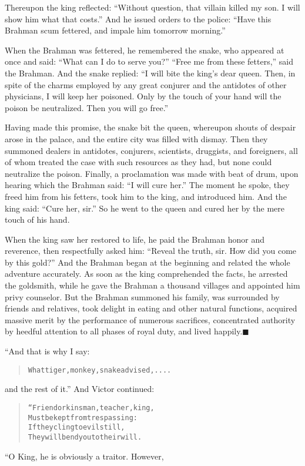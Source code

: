 \documentclass[article, twoside, 14pt]{memoir}
\newcommand{\qed}{\hfill \ensuremath{\blacksquare}}
\renewenvironment{verbatim}{%
\begin{quote}%
\vskip -10pt%
\begin{alltt}\normalfont\large}{\end{alltt}%
\end{quote}%
\vskip -10pt
} %
\begin{document}
Thereupon the king reflected:
``Without question, that villain killed my son. I will show him what that costs.''
And he issued orders to the police:
``Have this Brahman scum fettered, and impale him tomorrow morning.''

When the Brahman was fettered, he remembered the snake, who
appeared at once and said: ``What can I do to serve you?''
``Free me from these fetters,'' said the Brahman. And the snake
replied:
``I will bite the king's dear queen. Then, in spite of the charms employed by any great conjurer and the antidotes of other physicians, I will keep her poisoned. Only by the touch of your hand will the poison be neutralized. Then you will go free.''

Having made this promise, the snake bit the queen, whereupon shouts
of despair arose in the palace, and the entire city was filled with
dismay. Then they summoned dealers in antidotes, conjurers,
scientists, druggists, and foreigners, all of whom treated the case
with such resources as they had, but none could neutralize the
poison. Finally, a proclamation was made with beat of drum, upon
hearing which the Brahman said: ``I will cure her.'' The moment he
spoke, they freed him from his fetters, took him to the king, and
introduced him. And the king said: ``Cure her, sir.'' So he went to
the queen and cured her by the mere touch of his hand.

When the king saw her restored to life, he paid the Brahman honor
and reverence, then respectfully asked him:
``Reveal the truth, sir. How did you come by this gold?'' And the
Brahman began at the beginning and related the whole adventure
accurately. As soon as the king comprehended the facts, he arrested
the goldsmith, while he gave the Brahman a thousand villages and
appointed him privy counselor. But the Brahman summoned his family,
was surrounded by friends and relatives, took delight in eating and
other natural functions, acquired massive merit by the performance
of numerous sacrifices, concentrated authority by heedful attention
to all phases of royal duty, and lived
happily.\hyperref[s12]{\qed}

“And that is why I say:

\begin{verbatim}
What tiger, monkey, snake advised, ....
\end{verbatim}
and the rest of it.” And Victor continued:

\begin{verbatim}
“Friend or kinsman, teacher, king,
Must be kept from trespassing:
If they cling to evil still,
They will bend you to their will.
\end{verbatim}
“O King, he is obviously a traitor. However,
\end{document}

